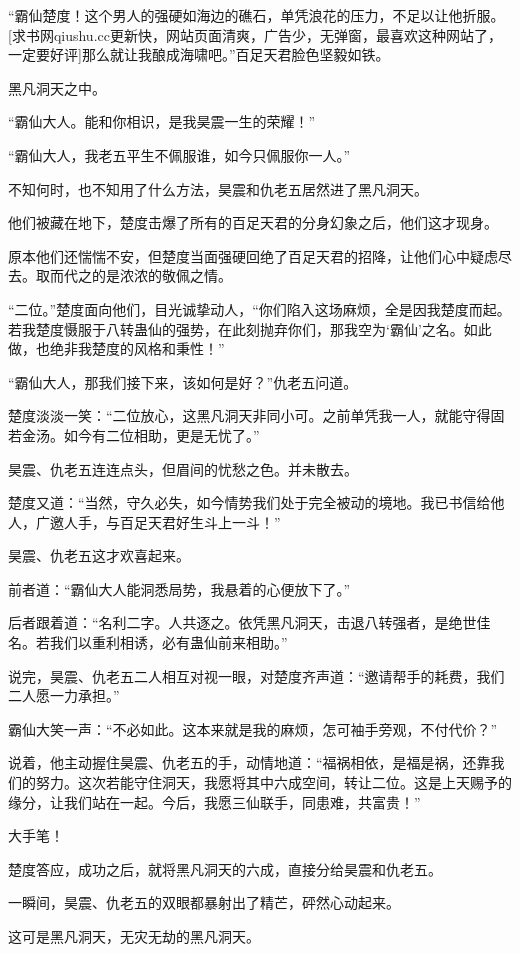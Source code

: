 \begin{this_body}
“霸仙楚度！这个男人的强硬如海边的礁石，单凭浪花的压力，不足以让他折服。[求书网qiushu.cc更新快，网站页面清爽，广告少，无弹窗，最喜欢这种网站了，一定要好评]那么就让我酿成海啸吧。”百足天君脸色坚毅如铁。

黑凡洞天之中。

“霸仙大人。能和你相识，是我昊震一生的荣耀！”

“霸仙大人，我老五平生不佩服谁，如今只佩服你一人。”

不知何时，也不知用了什么方法，昊震和仇老五居然进了黑凡洞天。

他们被藏在地下，楚度击爆了所有的百足天君的分身幻象之后，他们这才现身。

原本他们还惴惴不安，但楚度当面强硬回绝了百足天君的招降，让他们心中疑虑尽去。取而代之的是浓浓的敬佩之情。

“二位。”楚度面向他们，目光诚挚动人，“你们陷入这场麻烦，全是因我楚度而起。若我楚度慑服于八转蛊仙的强势，在此刻抛弃你们，那我空为‘霸仙’之名。如此做，也绝非我楚度的风格和秉性！”

“霸仙大人，那我们接下来，该如何是好？”仇老五问道。

楚度淡淡一笑：“二位放心，这黑凡洞天非同小可。之前单凭我一人，就能守得固若金汤。如今有二位相助，更是无忧了。”

昊震、仇老五连连点头，但眉间的忧愁之色。并未散去。

楚度又道：“当然，守久必失，如今情势我们处于完全被动的境地。我已书信给他人，广邀人手，与百足天君好生斗上一斗！”

昊震、仇老五这才欢喜起来。

前者道：“霸仙大人能洞悉局势，我悬着的心便放下了。”

后者跟着道：“名利二字。人共逐之。依凭黑凡洞天，击退八转强者，是绝世佳名。若我们以重利相诱，必有蛊仙前来相助。”

说完，昊震、仇老五二人相互对视一眼，对楚度齐声道：“邀请帮手的耗费，我们二人愿一力承担。”

霸仙大笑一声：“不必如此。这本来就是我的麻烦，怎可袖手旁观，不付代价？”

说着，他主动握住昊震、仇老五的手，动情地道：“福祸相依，是福是祸，还靠我们的努力。这次若能守住洞天，我愿将其中六成空间，转让二位。这是上天赐予的缘分，让我们站在一起。今后，我愿三仙联手，同患难，共富贵！”

大手笔！

楚度答应，成功之后，就将黑凡洞天的六成，直接分给昊震和仇老五。

一瞬间，昊震、仇老五的双眼都暴射出了精芒，砰然心动起来。

这可是黑凡洞天，无灾无劫的黑凡洞天。


\end{this_body}
